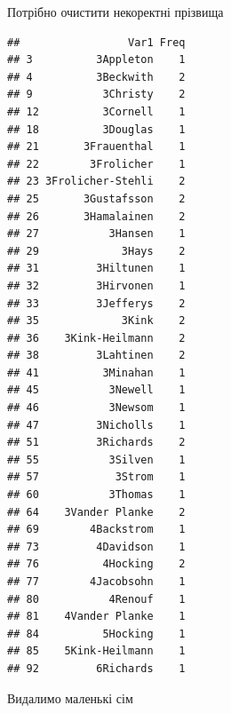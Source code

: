 \documentclass[ignorenonframetext,]{beamer}
\newenvironment{Shaded}{\begin{snugshade}}{\end{snugshade}}
\newcommand{\DecValTok}[1]{\textcolor[rgb]{0.00,0.00,0.81}{#1}}
\newcommand{\KeywordTok}[1]{\textcolor[rgb]{0.13,0.29,0.53}{\textbf{#1}}}
\newcommand{\NormalTok}[1]{#1}
\newcommand{\OperatorTok}[1]{\textcolor[rgb]{0.81,0.36,0.00}{\textbf{#1}}}
\newcommand{\StringTok}[1]{\textcolor[rgb]{0.31,0.60,0.02}{#1}}
\begin{document}
\begin{frame}[fragile]{Потрібно очистити некоректні прізвища}
\protect\hypertarget{ux43fux43eux442ux440ux456ux431ux43dux43e-ux43eux447ux438ux441ux442ux438ux442ux438-ux43dux435ux43aux43eux440ux435ux43aux442ux43dux456-ux43fux440ux456ux437ux432ux438ux449ux430}{}

\begin{Shaded}
\end{Shaded}

\begin{verbatim}
##                 Var1 Freq
## 3          3Appleton    1
## 4          3Beckwith    2
## 9           3Christy    2
## 12          3Cornell    1
## 18          3Douglas    1
## 21       3Frauenthal    1
## 22        3Frolicher    1
## 23 3Frolicher-Stehli    2
## 25       3Gustafsson    2
## 26       3Hamalainen    2
## 27           3Hansen    1
## 29             3Hays    2
## 31         3Hiltunen    1
## 32         3Hirvonen    1
## 33         3Jefferys    2
## 35             3Kink    2
## 36    3Kink-Heilmann    2
## 38         3Lahtinen    2
## 41          3Minahan    1
## 45           3Newell    1
## 46           3Newsom    1
## 47         3Nicholls    1
## 51         3Richards    2
## 55           3Silven    1
## 57            3Strom    1
## 60           3Thomas    1
## 64    3Vander Planke    2
## 69        4Backstrom    1
## 73         4Davidson    1
## 76          4Hocking    2
## 77        4Jacobsohn    1
## 80           4Renouf    1
## 81    4Vander Planke    1
## 84          5Hocking    1
## 85    5Kink-Heilmann    1
## 92         6Richards    1
\end{verbatim}

\end{frame}

\begin{frame}[fragile]{Видалимо маленькі сім}
\protect\hypertarget{ux432ux438ux434ux430ux43bux438ux43cux43e-ux43cux430ux43bux435ux43dux44cux43aux456-ux441ux456ux43c}{}

\begin{Shaded}
\end{Shaded}

\end{frame}
\end{document}
